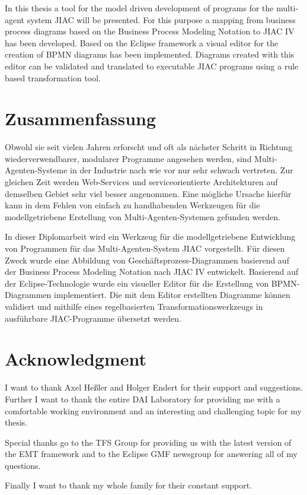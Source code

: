 In this thesis a tool for the model driven development of programs for the multi-agent system JIAC will be presented. For this purpose a mapping from business process diagrams based on the Business Process Modeling Notation to JIAC IV has been developed. Based on the Eclipse framework a visual editor for the creation of BPMN diagrams has been implemented. Diagrams created with this editor can be validated and translated to executable JIAC programs using a rule based transformation tool.



\section*{Zusammenfassung}

Obwohl sie seit vielen Jahren erforscht und oft als nächster Schritt in Richtung wiederverwendbarer, modularer Programme angesehen werden, sind Multi-Agenten-Systeme in der Industrie nach wie vor nur sehr schwach vertreten. Zur gleichen Zeit werden Web-Services und serviceorientierte Architekturen auf demselben Gebiet sehr viel besser angenommen. Eine mögliche Ursache hierfür kann in dem Fehlen von einfach zu handhabenden Werkzeugen für die modellgetriebene Erstellung von Multi-Agenten-Systemen gefunden werden.

In dieser Diplomarbeit wird ein Werkzeug für die modellgetriebene Entwicklung von Programmen für das Multi-Agenten-System JIAC vorgestellt. Für diesen Zweck wurde eine Abbildung von Geschäftsprozess-Diagrammen basierend auf der Business Process Modeling Notation nach JIAC IV entwickelt. Basierend auf der Eclipse-Technologie wurde ein visueller Editor für die Erstellung von BPMN-Diagrammen implementiert. Die mit dem Editor erstellten Diagramme können validiert und mithilfe eines regelbasierten Transformationswerkzeugs in ausführbare JIAC-Pro\-gramme übersetzt werden.

\newpage



\section*{Acknowledgment}

I want to thank Axel Heßler and Holger Endert for their support and suggestions. Further I want to thank the entire DAI Laboratory for providing me with a comfortable working environment and an interesting and challenging topic for my thesis.

Special thanks go to the TFS Group for providing us with the latest version of the EMT framework and to the Eclipse GMF newsgroup for answering all of my questions.

Finally I want to thank my whole family for their constant support.

\newpage